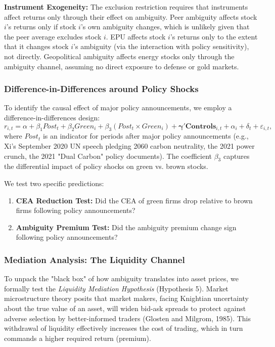 \documentclass[preprint,12pt,authoryear]{elsarticle}
\begin{document}
\textbf{Instrument Exogeneity:} The exclusion restriction requires that instruments affect returns only through their effect on ambiguity. Peer ambiguity affects stock $i$'s returns only if stock $i$'s own ambiguity changes, which is unlikely given that the peer average excludes stock $i$. EPU affects stock $i$'s returns only to the extent that it changes stock $i$'s ambiguity (via the interaction with policy sensitivity), not directly. Geopolitical ambiguity affects energy stocks only through the ambiguity channel, assuming no direct exposure to defense or gold markets.

\subsubsection{Difference-in-Differences around Policy Shocks}

To identify the causal effect of major policy announcements, we employ a difference-in-differences design:
\begin{equation}
r_{i,t} = \alpha + \beta_1 Post_t + \beta_2 Green_i + \beta_3 (Post_t \times Green_i) + \boldsymbol{\gamma}'\mathbf{Controls}_{i,t} + \alpha_i + \delta_t + \varepsilon_{i,t},
\end{equation}
where $Post_t$ is an indicator for periods after major policy announcements (e.g., Xi's September 2020 UN speech pledging 2060 carbon neutrality, the 2021 power crunch, the 2021 "Dual Carbon" policy documents). The coefficient $\beta_3$ captures the differential impact of policy shocks on green vs. brown stocks.

We test two specific predictions:
\begin{enumerate}
\item \textbf{CEA Reduction Test:} Did the CEA of green firms drop relative to brown firms following policy announcements?
\item \textbf{Ambiguity Premium Test:} Did the ambiguity premium change sign following policy announcements?
\end{enumerate}

\subsubsection{Mediation Analysis: The Liquidity Channel}

To unpack the "black box" of how ambiguity translates into asset prices, we formally test the \textit{Liquidity Mediation Hypothesis} (Hypothesis 5). Market microstructure theory posits that market makers, facing Knightian uncertainty about the true value of an asset, will widen bid-ask spreads to protect against adverse selection by better-informed traders (Glosten and Milgrom, 1985). This withdrawal of liquidity effectively increases the cost of trading, which in turn commands a higher required return (premium).
\end{document}
